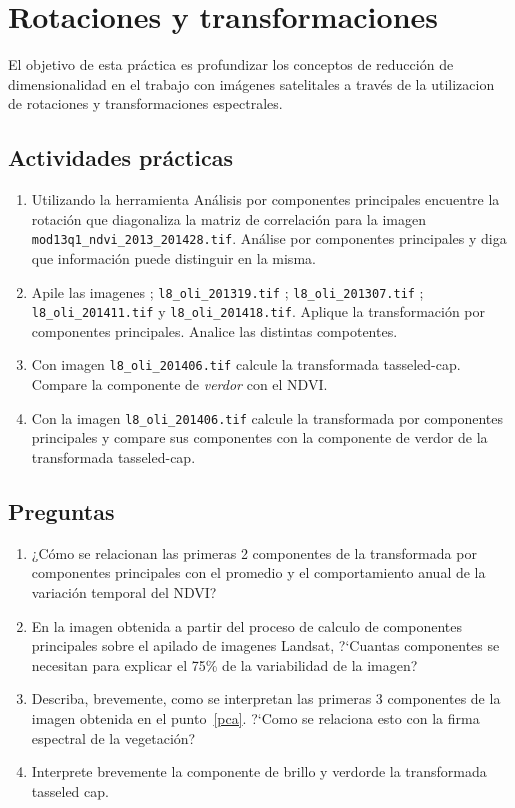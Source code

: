 \documentclass[hidelinks,12pt]{article}
\begin{document}
\section{Rotaciones y transformaciones}
El objetivo de esta práctica es  profundizar los conceptos de reducción
de dimensionalidad en el trabajo con imágenes satelitales a través de la
utilizacion de rotaciones y transformaciones espectrales.

\subsection{Actividades pr\'acticas}\label{rot:pra}
\begin{enumerate}
    \item Utilizando la herramienta Análisis por componentes principales
        encuentre la rotación que diagonaliza la matriz de correlación para la
        imagen \texttt{mod13q1\_ndvi\_2013\_2014\-28.tif}. Análise 
        por componentes principales y diga que información puede distinguir en la 
        misma. 
    \item \label{pca} Apile las imagenes
        ; \texttt{l8\_oli\_2013\-19.tif}
        ; \texttt{l8\_oli\_2013\-07.tif}
        ; \texttt{l8\_oli\_2014\-11.tif}
        y \texttt{l8\_oli\-\_2014\-18.tif}.
        Aplique la transformaci\'on por componentes principales.
        Analice las distintas compotentes.
    \item Con imagen \texttt{l8\_oli\_2014\-06.tif} calcule la 
        transformada tasseled-cap. Compare la componente de \emph{verdor} con
        el NDVI\@.
    \item Con la imagen \texttt{l8\_oli\_2014\-06.tif} calcule la 
        transformada por componentes principales y compare sus componentes con la
        componente de verdor de la transformada tasseled-cap.
\end{enumerate}

\subsection{Preguntas}
\begin{enumerate}
    \item ¿Cómo se relacionan las primeras 2 componentes de la transformada por
        componentes principales con el promedio y el comportamiento anual de la
        variaci\'on temporal del NDVI\@? 
    \item En la imagen obtenida a partir del proceso de calculo de componentes
        principales sobre el apilado de imagenes Landsat, ?`Cuantas componentes
        se necesitan para explicar el 75\% de la variabilidad de la imagen?
    \item Describa, brevemente, como se interpretan las primeras 3 componentes
        de la imagen obtenida en el punto~\ref{pca}. ?`Como se relaciona esto con la
        firma espectral de la vegetaci\'on?
    \item Interprete brevemente la componente de brillo y verdorde la transformada
        tasseled cap.
\end{enumerate}
\end{document}
